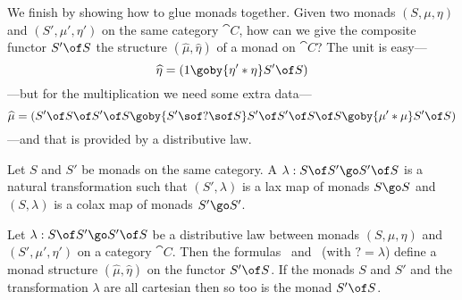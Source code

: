 We finish by showing how to glue monads together.  Given two monads $(S,
\mu, \eta)$ and $(S', \mu', \eta')$ on the same category $\cat{C}$, how can
we give the composite functor $S' \of S$ the structure $(\widehat{\mu},
\widehat{\eta})$ of a monad on $\cat{C}$?  The unit is easy---
%
\begin{equation}	\label{eq:distrib-unit}
\widehat{\eta}
=
\left(
1
\goby{\eta' * \eta}
S' \of S
\right)
\end{equation}
% 
---but for the multiplication we need some extra data---
% 
\begin{equation}	\label{eq:distrib-mult}
\widehat{\mu}
=
\left(
S' \of S \of S' \of S
\goby{S' \sof ? \sof S}
S' \of S' \of S \of S
\goby{\mu' * \mu}
S' \of S
\right)
\end{equation}
% 
---and that is provided by a distributive law.  
%
\begin{defn}	
Let $S$ and $S'$ be monads on the same category.  A %
%
%
$\lambda: S \of S' \go S' \of S$ is a natural transformation such that
$(S', \lambda)$ is a lax map of monads $S \go S$ and $(S, \lambda)$ is a
colax map of monads $S' \go S'$.  
\end{defn}

\begin{lemma}	
Let $\lambda: S \of S' \go S' \of S$ be a distributive law between monads
$(S, \mu, \eta)$ and $(S', \mu', \eta')$ on a category $\cat{C}$.  Then the
formulas~ and~ (with $? =
\lambda$) define a monad structure $(\widehat{\mu}, \widehat{\eta})$ on the
functor $S' \of S$.  If the monads $S$ and $S'$ and the transformation
$\lambda$ are all cartesian then so too is the monad $S' \of S$.  \done
\end{lemma}

